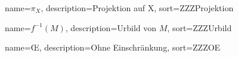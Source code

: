 {
  name={\ensuremath{\pi_X}},
  description={Projektion auf X},
  sort=ZZZProjektion
}

{
  name={\ensuremath{f^{-1}(M)}},
  description={Urbild von $M$},
  sort=ZZZUrbild
}

{
  name={$\text{\OE}$},
  description={Ohne Einschränkung},
  sort=ZZZOE
}

\renewcommand*{\glossaryname}{\glossarName}

\glsaddall
\printglossaries

